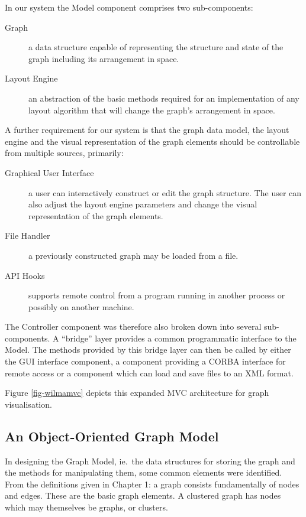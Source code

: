 \documentclass[runningheads]{cl2emult}
\begin{document}
In our system the Model component comprises two sub-components:
\begin{description}
\item[Graph] a data structure capable of representing the structure
and state of the graph including its arrangement in space.
\item[Layout Engine] an abstraction of the basic methods required for
an implementation of any layout algorithm that will change the graph's
arrangement in space.
\end{description}

A further requirement for our system is that the graph data model,
the layout engine and the visual representation of the graph elements should be controllable from multiple sources, primarily:
\begin{description}
\item[Graphical User Interface] a user can interactively construct or
edit the graph structure.  The user can also adjust the layout engine parameters and change the visual representation of the graph elements.
\item[File Handler] a previously constructed graph may be loaded from a file.
\item[API Hooks] supports remote control from a program running in another process or possibly on
another machine. 
\end{description}
The Controller component was therefore also broken
down into several sub-components.  A ``bridge'' layer provides a common
programmatic interface to the Model.  The methods provided by this
bridge layer can then be called by either the GUI interface component,
a component providing a CORBA interface for remote access or a component which
can load and save files to an XML format.

Figure \ref{fig-wilmamvc} depicts this expanded MVC architecture for graph
visualisation. 

\subsection{An Object-Oriented Graph Model}
In designing the Graph Model, ie.\ the data structures for storing the
graph and the methods for manipulating them, some common
elements were identified.  From the definitions given in Chapter 
1: a graph consists fundamentally
of nodes and edges.  These are the basic graph elements.  A clustered
graph has nodes which may themselves be graphs, or clusters.
\end{document}

